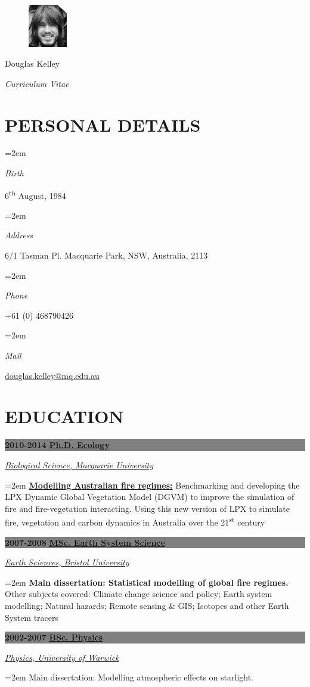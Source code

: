\documentclass[paper=a4,fontsize=11pt]{scrartcl}	 			%
\newlength{\spacebox}
\newcommand{\sepspace}{\vspace*{0em}}			%
\newcommand{\NewPart}[1]{\vspace*{-0.5em} \section*{\uppercase{#1}} \vspace*{-0.75em} }
\newcommand{\MyName}[1]{
		\Huge \usefont{OT1}{phv}{b}{n} \hfill #1 		%
		\par \normalsize \normalfont}
\newcommand{\MySlogan}[1]{
		\large \usefont{OT1}{phv}{m}{n}\hfill \textit{#1} %
		\par \normalsize \normalfont}
\newcommand{\PersonalEntry}[2]{
		\noindent\hangindent=2em\hangafter=0 		%
		\parbox{\spacebox}{						%
		\textit{#1}}								%
		\hspace{1.5em} #2 \par}					%
\newcommand{\EducationEntry}[4]{ \vspace*{0.7em}
		\noindent \colorbox{gray}{%
			\parbox{46em}{%
			\color{Black}\textbf{#2} \hspace{0.5cm} \textbf{#1}}} 				%
		\vspace*{-1em}
		\hfill 	\par				%
		\noindent \textit{#3} \par					%
		\noindent\hangindent=2em\hangafter=0 \small #4 	%
		\normalsize \par}
\begin{document}
\begin{figure}
	\vspace*{-5em}
		\includegraphics[width=0.15\textwidth]{Doug-Kelley.jpg}
\end{figure}

\MyName{Douglas Kelley}
\MySlogan{Curriculum Vitae}

\sepspace

\NewPart{Personal details}{}

\PersonalEntry{Birth}{6\textsuperscript{th} August, 1984} 
\PersonalEntry{Address}{6/1 Tasman Pl. Macquarie Park, NSW, Australia, 2113}
\PersonalEntry{Phone}{+61 (0) 468790426}
\PersonalEntry{Mail}{\url{douglas.kelley@mq.edu.au}}

\NewPart{Education}{} 

\EducationEntry{\href{http://bcd.mq.edu.au/?page_id=171}{Ph.D. Ecology}}{2010-2014}{\href{http://bio.mq.edu.au/}{Biological Science, Macquarie University}}
  {\textbf{\href{http://bcd.mq.edu.au/?p=361}{Modelling Australian fire regimes:}} Benchmarking and developing the LPX Dynamic Global Vegetation Model (DGVM) to improve the simulation of fire and fire-vegetation interacting. Using this new version of LPX to simulate fire, vegetation and carbon dynamics in Australia over the 21\textsuperscript{st} century}
\sepspace

\EducationEntry{\href{http://www.bristol.ac.uk/cabot/postgrad/msc-ccsp.html}
             {MSc. Earth System Science}}{2007-2008}{\href{http://www.bristol.ac.uk/earthsciences/}{Earth Sciences, Bristol University}}
  {\textbf{Main dissertation: Statistical modelling of global fire regimes.} Other subjects covered: Climate change science and policy; Earth system modelling; Natural hazards; Remote sensing \& GIS; Isotopes and other Earth System tracers}
\sepspace

\EducationEntry{\href{http://www2.warwick.ac.uk/study/undergraduate/courses/f300}{BSc. Physics}}{2002-2007}{\href{http://www2.warwick.ac.uk/fac/sci/physics/}{Physics, University of Warwick}}
  {Main dissertation: Modelling atmospheric effects on starlight.}
  
\end{document}
